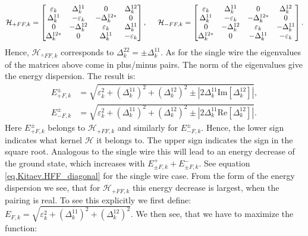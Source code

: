 \begin{equation}
\mathcal{H}_{+FF,k} = \begin{bmatrix} \varepsilon_{k} & \Delta^{11}_k    & 0               & \Delta^{12}_k\\ 
                                    \Delta^{11}_k     & -\varepsilon_{k} & -\Delta^{12*}_k & 0 \\ 
                                    0                 & -\Delta^{12}_k   & \varepsilon_{k} & \Delta^{11}_k \\ 
                                    \Delta^{12*}_k    & 0                & \Delta^{11}_k   & -\varepsilon_{k} \end{bmatrix}, \hspace{0.5cm}
\mathcal{H}_{-FF,k} = \begin{bmatrix} \varepsilon_{k} & \Delta^{11}_k    & 0               & \Delta^{12}_k\\ 
                                    \Delta^{11}_k     & -\varepsilon_{k} & -\Delta^{12*}_k & 0 \\ 
                                    0                 & -\Delta^{12}_k   & \varepsilon_{k} & -\Delta^{11}_k \\ 
                                    \Delta^{12*}_k    & 0                & -\Delta^{11}_k  & -\varepsilon_{k} \end{bmatrix}.                        
\end{equation}
Hence, $\mathcal{H}_{^\pm FF,k}$ corresponds to $\Delta^{22}_k = \pm \Delta^{11}_k$. As for the single wire the eigenvalues of the matrices above come in plus/minus pairs. The norm of the eigenvalues give the energy dispersion. The result is:
\begin{align}
E^{\pm}_{+F,k} &= \sqrt{\varepsilon^2_k + \left(\Delta^{11}_k\right)^2 + \left(\Delta^{12}_k\right)^2 \pm \left|2\Delta^{11}_k\text{Im}\left[\Delta^{12}_k\right]\right|}, \nonumber \\
E^{\pm}_{-F,k} &= \sqrt{\varepsilon^2_k + \left(\Delta^{11}_k\right)^2 + \left(\Delta^{12}_k\right)^2 \pm \left|2\Delta^{11}_k\text{Re}\left[\Delta^{12}_k\right]\right|}. \nonumber 
\end{align} 
Here $E^{\pm}_{+F,k}$ belongs to $\mathcal{H}_{+FF,k}$ and similarly for $E^{\pm}_{-F,k}$. Hence, the lower sign indicates what kernel $\mathcal{H}$ it belongs to. The upper sign indicates the sign in the square root. Analogous to the single wire this will lead to an energy decrease of the ground state, which increases with $E^{+}_{\pm F,k} + E^{-}_{\pm F,k}$. See equation \eqref{eq.Kitaev.HFF_diagonal} for the single wire case. From the form of the energy dispersion we see, that for $\mathcal{H}_{+FF,k}$ this energy decrease is largest, when the pairing is real. To see this explicitly we first define: $E_{F,k} = \sqrt{\varepsilon^2_k + \left(\Delta^{11}_k\right)^2 + \left(\Delta^{12}_k\right)^2}$. We then see, that we have to maximize the function:
